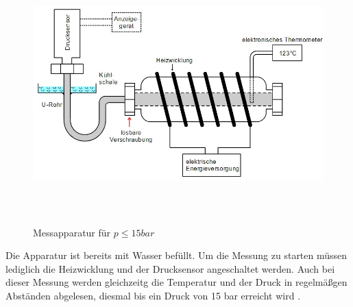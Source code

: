 \begin{figure}
  \centering
  \includegraphics[height=10cm]{Aufbau2.jpg}
  \caption{Messapparatur für $p ≤ 15 bar$}
  \label{fig:aufbau2}
\end{figure}

Die Apparatur ist bereits mit Wasser befüllt. Um die Messung zu starten müssen
lediglich die Heizwicklung und der Drucksensor angeschaltet werden. Auch bei
dieser Messung werden gleichzeitg die Temperatur und der Druck in regelmäßgen
Abständen abgelesen, diesmal bis ein Druck von 15 bar erreicht wird \cite{TU}.
